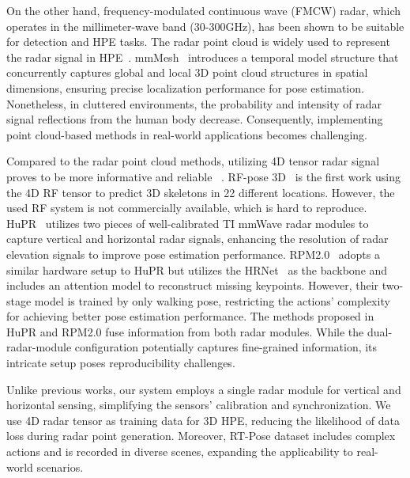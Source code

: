 On the other hand, frequency-modulated continuous wave (FMCW) radar, which operates in the millimeter-wave band (30-300GHz), has been shown to be suitable for detection and HPE tasks. 
The radar point cloud is widely used to represent the radar signal in HPE~\cite{an2021mars,sengupta2020nlp,zhang2021comprehensive,NEURIPS2022_af9c9c6d,xue2021mmmesh,chen2022mmbody,sengupta2020mm}. mmMesh~\cite{xue2021mmmesh} introduces a temporal model structure that concurrently captures global and local 3D point cloud structures in spatial dimensions, ensuring precise localization performance for pose estimation. Nonetheless, in cluttered environments, the probability and intensity of radar signal reflections from the human body decrease. Consequently, implementing point cloud-based methods in real-world applications becomes challenging.

Compared to the radar point cloud methods, 
utilizing 4D tensor radar signal proves to be more informative and reliable
~\cite{xie2023rpm,zhao2018rf,lee2023hupr,zhao2022angle}. RF-pose 3D~\cite{zhao2018rf} is the first work using the 4D RF tensor to predict 3D skeletons in 22 different locations. However, the used RF system is not commercially available, which is hard to reproduce. HuPR~\cite{lee2023hupr} utilizes two pieces of well-calibrated TI mmWave radar modules to capture vertical and horizontal radar signals, enhancing the resolution of radar elevation signals to improve pose estimation performance. RPM2.0~\cite{xie2023rpm} adopts a similar hardware setup to HuPR but utilizes the HRNet~\cite{wang2020deep} as the backbone and includes an attention model to reconstruct missing keypoints. However, their two-stage model is trained by only walking pose, restricting the actions' complexity for achieving better pose estimation performance. 
The methods proposed in HuPR and RPM2.0 fuse information from both radar modules.
While the dual-radar-module configuration potentially captures fine-grained information, its intricate setup poses reproducibility challenges. 

 Unlike previous works, our system employs a single radar module for vertical and horizontal sensing, simplifying the sensors' calibration and synchronization. We use 4D radar tensor as training data for 3D HPE, reducing the likelihood of data loss during radar point generation. Moreover, RT-Pose dataset includes complex actions and is recorded in diverse scenes, expanding the applicability to real-world scenarios. 


